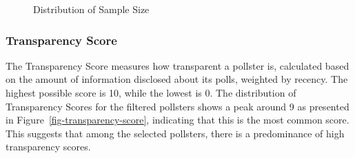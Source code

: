 \documentclass[
  letterpaper,
  DIV=11,
  numbers=noendperiod]{scrartcl}
\begin{document}
\begin{figure}


\caption{\label{fig-sample-size}Distribution of Sample Size}

\end{figure}%

\subsubsection{Transparency Score}\label{transparency-score}

The Transparency Score measures how transparent a pollster is,
calculated based on the amount of information disclosed about its polls,
weighted by recency. The highest possible score is 10, while the lowest
is 0. The distribution of Transparency Scores for the filtered pollsters
shows a peak around 9 as presented in
Figure~\ref{fig-transparency-score}, indicating that this is the most
common score. This suggests that among the selected pollsters, there is
a predominance of high transparency scores.
\end{document}
